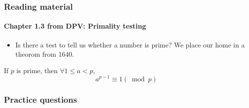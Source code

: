\documentclass[a4paper,11pt]{article}
\begin{document}
\subsubsection{Reading material}\label{reading-material}

\paragraph{Chapter 1.3 from DPV: Primality
testing}\label{chapter-1.3-from-dpv-primality-testing}

\begin{itemize}
\itemsep1pt\parskip0pt
\item
  Is there a test to tell us whether a number is prime? We place our
  home in a theorom from 1640.
\end{itemize}

\begin{description}
\itemsep1pt\parskip0pt
\item[Fermat's Little Theorem]
If $p$ is prime, then $\forall 1 \le a < p$,
\[a^{p - 1} \equiv 1 (\bmod p)\]
\end{description}

\subsubsection{Practice questions}\label{practice-questions-4}
\end{document}
